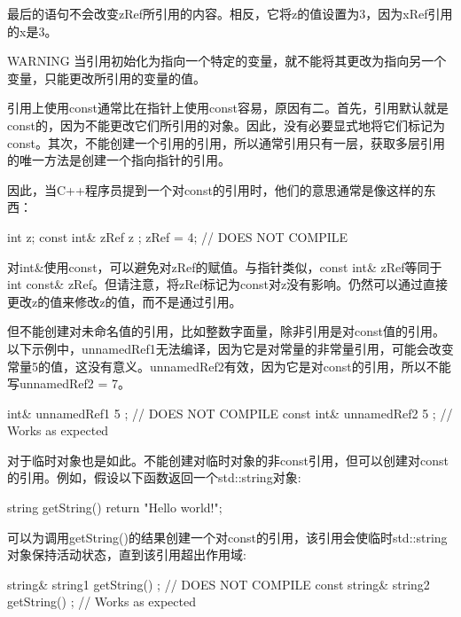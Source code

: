 最后的语句不会改变zRef所引用的内容。相反，它将z的值设置为3，因为xRef引用的x是3。

\begin{myWarning}{WARNING}
当引用初始化为指向一个特定的变量，就不能将其更改为指向另一个变量，只能更改所引用的变量的值。
\end{myWarning}


引用上使用const通常比在指针上使用const容易，原因有二。首先，引用默认就是const的，因为不能更改它们所引用的对象。因此，没有必要显式地将它们标记为const。其次，不能创建一个引用的引用，所以通常引用只有一层，获取多层引用的唯一方法是创建一个指向指针的引用。

因此，当C++程序员提到一个对const的引用时，他们的意思通常是像这样的东西：

\begin{cpp}
int z;
const int& zRef { z };
zRef = 4; // DOES NOT COMPILE
\end{cpp}

对int\&使用const，可以避免对zRef的赋值。与指针类似，const int\& zRef等同于int const\& zRef。但请注意，将zRef标记为const对z没有影响。仍然可以通过直接更改z的值来修改z的值，而不是通过引用。

但不能创建对未命名值的引用，比如整数字面量，除非引用是对const值的引用。以下示例中，unnamedRef1无法编译，因为它是对常量的非常量引用，可能会改变常量5的值，这没有意义。unnamedRef2有效，因为它是对const的引用，所以不能写unnamedRef2 = 7。

\begin{cpp}
int& unnamedRef1 { 5 }; // DOES NOT COMPILE
const int& unnamedRef2 { 5 }; // Works as expected
\end{cpp}

对于临时对象也是如此。不能创建对临时对象的非const引用，但可以创建对const的引用。例如，假设以下函数返回一个std::string对象:

\begin{cpp}
string getString() { return "Hello world!"; }
\end{cpp}

可以为调用getString()的结果创建一个对const的引用，该引用会使临时std::string对象保持活动状态，直到该引用超出作用域:

\begin{cpp}
string& string1 { getString() }; // DOES NOT COMPILE
const string& string2 { getString() }; // Works as expected
\end{cpp}


